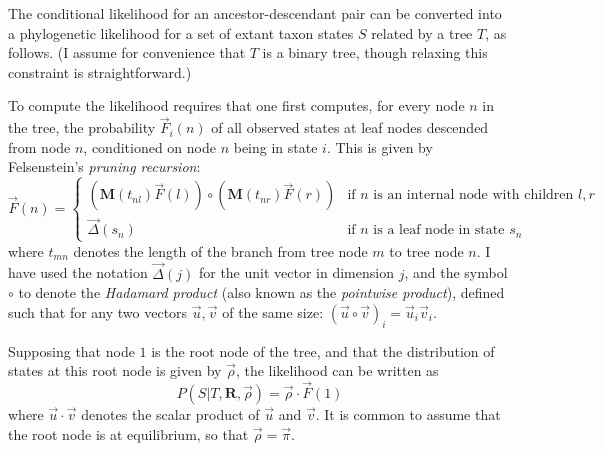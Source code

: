 \documentclass{bmcart}
\newcommand{\matr}[1]{\mathbf{#1}}
\newcommand{\ratematrix}{\matr{R}}
\newcommand{\eqmvec}{\vec{\pi}}
\newcommand{\condmatrix}{\matr{M}}
\newcommand{\felsvec}{\vec{F}}
\newcommand{\unitvec}{\vec{\Delta}}
\newcommand{\pointprod}{\circ}
\newcommand{\scalarprod}{\cdot}
\newcommand{\initvec}{\vec{\rho}}
\begin{document}
The conditional likelihood for an ancestor-descendant pair can be converted
into a phylogenetic likelihood for a set of extant taxon states $S$ related by a tree $T$,
as follows.
(I assume for convenience that $T$ is a binary tree, though relaxing this constraint is straightforward.)

To compute the likelihood requires that one first computes, for every node $n$ in the tree,
the probability $\felsvec_i(n)$
of all observed states at leaf nodes descended from node $n$,
conditioned on node $n$ being in state $i$.
This is given by Felsenstein's {\em pruning recursion}:
\begin{equation}
\felsvec(n) = \left\{
\begin{array}{ll}
\displaystyle
\left( \condmatrix(t_{nl}) \felsvec(l) \right)
\pointprod
\left( \condmatrix(t_{nr}) \felsvec(r) \right)
& \mbox{if $n$ is an internal node with children $l,r$} \\
\displaystyle
\vec{\Delta}(s_n)
& \mbox{if $n$ is a leaf node in state $s_n$}
\end{array}
\right.
\label{Felsenstein}
\end{equation}
where $t_{mn}$ denotes the length of the branch from tree node $m$ to tree node $n$.
I have used the notation
$\unitvec(j)$ for the unit vector in dimension $j$,
and the symbol
$\pointprod$ to denote the {\em Hadamard product} (also known as the {\em pointwise product}),
defined such that for any two vectors $\vec{u},\vec{v}$ of the same size:
$(\vec{u} \pointprod \vec{v})_i = \vec{u}_i \vec{v}_i$.

Supposing that node $1$ is the root node of the tree,
and that the distribution of states at this root node is given by $\initvec$,
the likelihood can be written as
\begin{equation}
P(S|T,\ratematrix,\initvec) = \initvec \scalarprod \felsvec(1)
\label{Likelihood}
\end{equation}
where $\vec{u} \scalarprod \vec{v}$ denotes the scalar product of $\vec{u}$ and $\vec{v}$.
It is common to assume that the root node is at equilibrium,
so that $\initvec = \eqmvec$.
\end{document}

